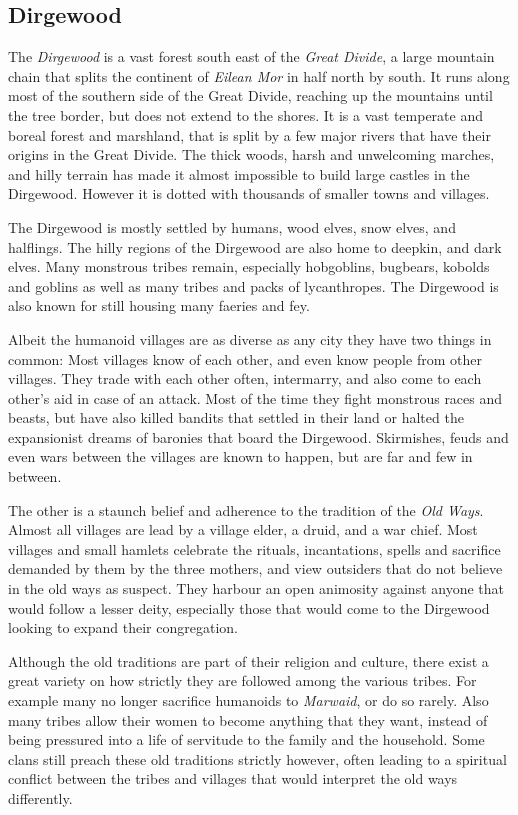 \subsection{Dirgewood}

The \emph{Dirgewood} is a vast forest south east of the \emph{Great Divide}, a
large mountain chain that splits the continent of \emph{Eilean Mor} in half
north by south. It runs along most of the southern side of the Great Divide,
reaching up the mountains until the tree border, but does not extend to the
shores. It is a vast temperate and boreal forest and marshland, that is split
by a few major rivers that have their origins in the Great Divide. The thick
woods, harsh and unwelcoming marches, and hilly terrain has made it almost
impossible to build large castles in the Dirgewood. However it is dotted with
thousands of smaller towns and villages.

The Dirgewood is mostly settled by humans, wood elves, snow elves, and
halflings. The hilly regions of the Dirgewood are also home to deepkin, and
dark elves. Many monstrous tribes remain, especially hobgoblins, bugbears,
kobolds and goblins as well as many tribes and packs of lycanthropes. The
Dirgewood is also known for still housing many faeries and fey.

Albeit the humanoid villages are as diverse as any city they have two things
in common: Most villages know of each other, and even know people from other
villages. They trade with each other often, intermarry, and also come to each
other's aid in case of an attack. Most of the time they fight monstrous races
and beasts, but have also killed bandits that settled in their land or halted
the expansionist dreams of baronies that board the Dirgewood. Skirmishes,
feuds and even wars between the villages are known to happen, but are far and
few in between.

The other is a staunch belief and adherence to the tradition of the
\emph{Old Ways}. Almost all villages are lead by a village elder, a druid, and
a war chief. Most villages and small hamlets celebrate the rituals,
incantations, spells and sacrifice demanded by them by the three mothers, and
view outsiders that do not believe in the old ways as suspect. They harbour an
open animosity against anyone that would follow a lesser deity, especially
those that would come to the Dirgewood looking to expand their congregation.

Although the old traditions are part of their religion and culture, there exist
a great variety on how strictly they are followed among the various tribes.
For example many no longer sacrifice humanoids to \emph{Marwaid}, or do so
rarely. Also many tribes allow their women to become anything that they want,
instead of being pressured into a life of servitude to the family and the
household. Some clans still preach these old traditions strictly however,
often leading to a spiritual conflict between the tribes and villages that
would interpret the old ways differently.

